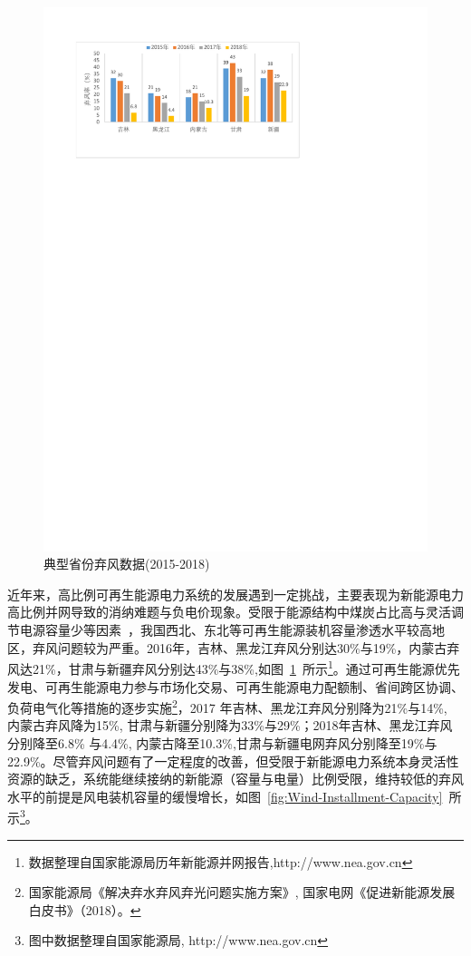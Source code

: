 \begin{figure}[H] %
  \centering
  \includegraphics[scale=0.95]{figures/Chap1-1-Wind-Curtailment-Province.pdf}
  \caption{典型省份弃风数据(2015-2018)}
  \label{fig:Wind-Curtailment-Province}
\end{figure}

近年来，高比例可再生能源电力系统的发展遇到一定挑战，主要表现为新能源电力高比例并网导致的消纳难题与负电价现象。受限于能源结构中煤炭占比高与灵活调节电源容量少等因素~\cite{Renewable-Consum-17}，我国西北、东北等可再生能源装机容量渗透水平较高地区，弃风问题较为严重。2016年，吉林、黑龙江弃风分别达30\%与19\%，内蒙古弃风达21\%，甘肃与新疆弃风分别达43\%与38\%,如图~\ref{fig:Wind-Curtailment-Province}~所示\footnote{数据整理自国家能源局历年新能源并网报告,http://www.nea.gov.cn}。通过可再生能源优先发电、可再生能源电力参与市场化交易、可再生能源电力配额制、省间跨区协调、负荷电气化等措施的逐步实施\footnote{国家能源局《解决弃水弃风弃光问题实施方案》, 国家电网《促进新能源发展白皮书》（2018）。}，2017 年吉林、黑龙江弃风分别降为21\%与14\%, 内蒙古弃风降为15\%, 甘肃与新疆分别降为33\%与29\%；2018年吉林、黑龙江弃风分别降至6.8\% 与4.4\%, 内蒙古降至10.3\%,甘肃与新疆电网弃风分别降至19\%与22.9\%。尽管弃风问题有了一定程度的改善，但受限于新能源电力系统本身灵活性资源的缺乏，系统能继续接纳的新能源（容量与电量）比例受限，维持较低的弃风水平的前提是风电装机容量的缓慢增长，如图~\ref{fig:Wind-Installment-Capacity}~所示\footnote{图中数据整理自国家能源局, http://www.nea.gov.cn}。

